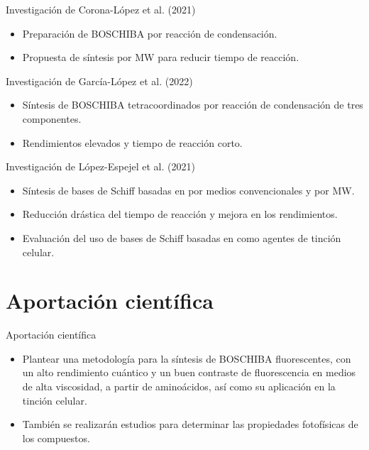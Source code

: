 \documentclass[%
spanish,
mexico]{beamer}
\begin{document}
\begin{frame}{Investigación de Corona-López et al. (2021)}
    \begin{itemize}
        \item Preparación de \gls{BOSCHIBA} por reacción de condensación.
        \item Propuesta de síntesis por \gls{MW} para reducir tiempo de reacción.
    \end{itemize}
\end{frame}

\begin{frame}{Investigación de García-López et al. (2022)}
    \begin{itemize}
        \item Síntesis de \gls{BOSCHIBA} tetracoordinados por reacción de condensación de tres componentes.
        \item Rendimientos elevados y tiempo de reacción corto.
    \end{itemize}
\end{frame}

\begin{frame}{Investigación de López-Espejel et al. (2021)}
    \begin{itemize}
        \item Síntesis de bases de Schiff basadas en  por medios convencionales y por \gls{MW}.
        \item Reducción drástica del tiempo de reacción y mejora en los rendimientos.
        \item Evaluación del uso de bases de Schiff basadas en  como agentes de tinción celular.
    \end{itemize}
\end{frame}

\section{Aportación científica}
\begin{frame}{Aportación científica}
    \begin{itemize}
        \item Plantear una metodología para la síntesis de \gls{BOSCHIBA} fluorescentes, con un alto rendimiento cuántico y un buen contraste de fluorescencia en medios de alta viscosidad, a partir de aminoácidos, así como su aplicación en la tinción celular.
        \item También se realizarán estudios \insilico{} para determinar las propiedades fotofísicas de los compuestos.
    \end{itemize}
\end{frame}
\end{document}

